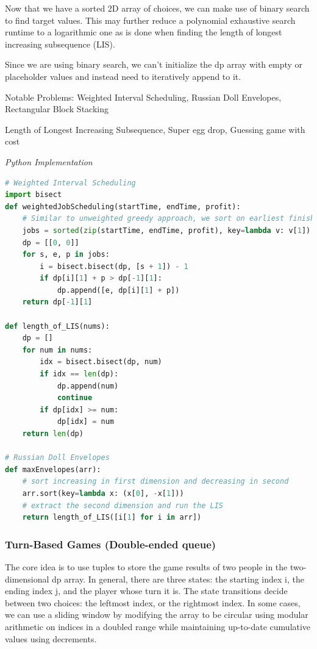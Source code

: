 \documentclass{article}
\begin{document}
Now that we have a sorted 2D array of choices, we can make use of binary search to find target values. This may further reduce a polynomial exhaustive search runtime to a logarithmic one as is done when finding the length of longest increasing subsequence (LIS). 

Since we are using binary search, we can't initialize the dp array with empty or placeholder values and instead need to iteratively append to it. 

Notable Problems: Weighted Interval Scheduling, Russian Doll Envelopes, Rectangular Block Stacking

Length of Longest Increasing Subsequence, Super egg drop, Guessing game with cost %

\vspace{8pt} \emph{Python Implementation}
\begin{lstlisting}[language=Python]
# Weighted Interval Scheduling
import bisect
def weightedJobScheduling(startTime, endTime, profit):
    # Similar to unweighted greedy approach, we sort on earliest finish time
    jobs = sorted(zip(startTime, endTime, profit), key=lambda v: v[1])
    dp = [[0, 0]]
    for s, e, p in jobs:
        i = bisect.bisect(dp, [s + 1]) - 1
        if dp[i][1] + p > dp[-1][1]:
            dp.append([e, dp[i][1] + p])
    return dp[-1][1]

def length_of_LIS(nums):
    dp = []
    for num in nums:
        idx = bisect.bisect(dp, num)
        if idx == len(dp):
            dp.append(num)
            continue
        if dp[idx] >= num:
            dp[idx] = num
    return len(dp)

# Russian Doll Envelopes
def maxEnvelopes(arr):
    # sort increasing in first dimension and decreasing in second
    arr.sort(key=lambda x: (x[0], -x[1]))
    # extract the second dimension and run the LIS
    return length_of_LIS([i[1] for i in arr])
\end{lstlisting}

\subsubsection*{Turn-Based Games (Double-ended queue)}
The core idea is to use tuples to store the game results of two people in the two-dimensional dp array. In general, there are three states: the starting index i, the ending index j, and the player whose turn it is. The state transitions decide between two choices: the leftmost index, or the rightmost index. In some cases, we can use a sliding window by modifying the array to be circular using modular arithmetic on indices in a doubled range while maintaining up-to-date cumulative values using decrements.
\end{document}

